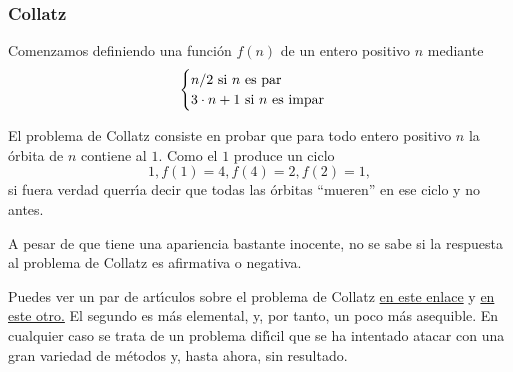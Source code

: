 \subsubsection{Collatz}



Comenzamos definiendo  una funci\'on $f(n)$ de un entero positivo $n$ mediante 
\begin{equation}\notag
\begin{cases}
 n/2 \text{ si $n$ es par}\\
 3\cdot n+1 \text{ si $n$ es impar}
\end{cases}
\end{equation}

El problema de Collatz consiste en probar que para todo entero  positivo $n$ la
\'orbita de $n$ contiene al $1$. Como el $1$ produce un ciclo 
\[1,f(1)=4,f(4)=2,f(2)=1,\]
\noindent si fuera verdad querr\'{\i}a decir que todas las \'orbitas ``mueren''
en ese ciclo y no antes.

A pesar de que tiene una apariencia bastante inocente, {\sc no se sabe} si la
respuesta al problema de Collatz es afirmativa o negativa. 

Puedes ver un par de art\'{\i}culos sobre el problema de Collatz 
\href{http://150.244.21.37/PDFs/PROGR/collatz-conj.pdf}{en este enlace} y 
\href{http://150.244.21.37/PDFs/PROGR/collatz-conj2.pdf}{en este otro.} El segundo es m\'as
elemental, y, por tanto, un poco m\'as asequible. En cualquier caso se trata de
un problema dif\'{\i}cil que se ha intentado atacar con una gran variedad de
m\'etodos y, hasta ahora, sin resultado.

\par
\medskip
\par

